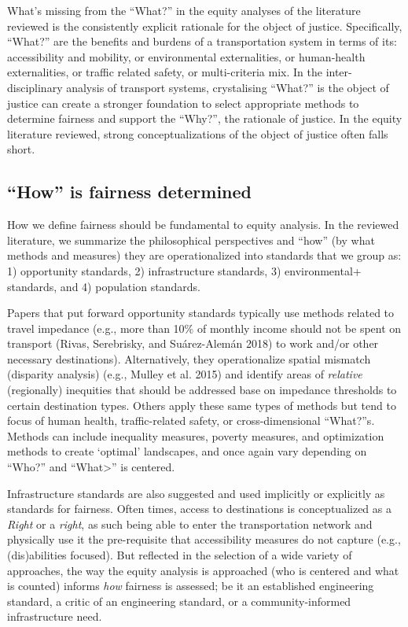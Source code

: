 \documentclass[12pt, oneside]{report}
\begin{document}
What's missing from the ``What?'' in the equity analyses of the
literature reviewed is the consistently explicit rationale for the
object of justice. Specifically, ``What?'' are the benefits and burdens
of a transportation system in terms of its: accessibility and mobility,
or environmental externalities, or human-health externalities, or
traffic related safety, or multi-criteria mix. In the inter-disciplinary
analysis of transport systems, crystalising ``What?'' is the object of
justice can create a stronger foundation to select appropriate methods
to determine fairness and support the ``Why?'', the rationale of
justice. In the equity literature reviewed, strong conceptualizations of
the object of justice often falls short.

\hypertarget{how-is-fairness-determined}{%
\subsection{``How'' is fairness
determined}\label{how-is-fairness-determined}}

How we define fairness should be fundamental to equity analysis. In the
reviewed literature, we summarize the philosophical perspectives and
``how'' (by what methods and measures) they are operationalized into
standards that we group as: 1) opportunity standards, 2) infrastructure
standards, 3) environmental+ standards, and 4) population standards.

Papers that put forward opportunity standards typically use methods
related to travel impedance (e.g., more than 10\% of monthly income
should not be spent on transport (Rivas, Serebrisky, and Suárez-Alemán
2018) to work and/or other necessary destinations). Alternatively, they
operationalize spatial mismatch (disparity analysis) (e.g., Mulley et
al. 2015) and identify areas of \emph{relative} (regionally) inequities
that should be addressed base on impedance thresholds to certain
destination types. Others apply these same types of methods but tend to
focus of human health, traffic-related safety, or cross-dimensional
``What?''s. Methods can include inequality measures, poverty measures,
and optimization methods to create `optimal' landscapes, and once again
vary depending on ``Who?'' and ``What\textgreater{}'' is centered.

Infrastructure standards are also suggested and used implicitly or
explicitly as standards for fairness. Often times, access to
destinations is conceptualized as a \emph{Right} or a \emph{right}, as
such being able to enter the transportation network and physically use
it the pre-requisite that accessibility measures do not capture (e.g.,
(dis)abilities focused). But reflected in the selection of a wide
variety of approaches, the way the equity analysis is approached (who is
centered and what is counted) informs \emph{how} fairness is assessed;
be it an established engineering standard, a critic of an engineering
standard, or a community-informed infrastructure need.
\end{document}
